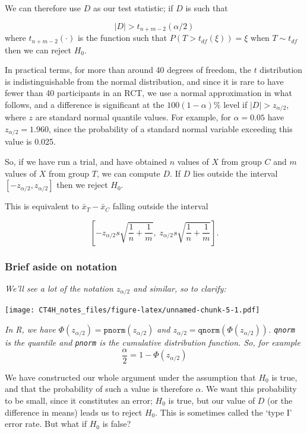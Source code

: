 \documentclass[
  openany]{book}
\theoremstyle{definition}
\theoremstyle{definition}
\theoremstyle{definition}
\theoremstyle{definition}
\theoremstyle{remark}
\begin{document}
We can therefore use \(D\) as our test statistic; if \(D\) is such that

\[ |D| > t_{n+m-2}\left(\alpha/2\right)\]
where
\(t_{n+m-2}\left(\cdot\right)\) is the function such that \(P\left(T>t_{df}\left(\xi\right)\right) = \xi\) when \(T \sim{t_{df}}\) then we can reject \(H_0\).

In practical terms, for more than around 40 degrees of freedom, the \(t\) distribution is indistinguishable from the normal distribution, and since it is rare to have fewer than 40 participants in an RCT, we use a normal approximation in what follows, and a difference is significant at the \(100\left(1-\alpha\right) \%\) level if \(|D| > z_{\alpha/2}\), where \(z\) are standard normal quantile values. For example, for \(\alpha=0.05\) have \(z_{\alpha/2} = 1.960\), since the probability of a standard normal variable exceeding this value is 0.025.

So, if we have run a trial, and have obtained \(n\) values of \(X\) from group \(C\) and \(m\) values of \(X\) from group \(T\), we can compute \(D\). If \(D\) lies outside the interval \(\left[-z_{\alpha/2}, z_{\alpha/2}\right]\) then we reject \(H_0\).

This is equivalent to \(\bar{x}_T - \bar{x}_C\) falling outside the interval

\[\left[-z_{\alpha/2}s\sqrt{\frac{1}{n} + \frac{1}{m}},\; z_{\alpha/2}s\sqrt{\frac{1}{n} + \frac{1}{m}}  \right]. \]

\hypertarget{brief-aside-on-notation}{%
\subsubsection*{Brief aside on notation}\label{brief-aside-on-notation}}

\emph{We'll see a lot of the notation \(z_{\alpha/2}\) and similar, so to clarify:}

\texttt{[image: CT4H\_notes\_files/figure-latex/unnamed-chunk-5-1.pdf]}

\emph{In R, we have \(\Phi\left(z_{\alpha/2}\right) = \texttt{pnorm}\left(z_{\alpha/2}\right)\) and \(z_{\alpha/2} = \texttt{qnorm}\left(\Phi\left(z_{\alpha/2}\right)\right)\). \texttt{qnorm} is the quantile and \texttt{pnorm} is the cumulative distribution function. So, for example}
\[\frac{\alpha}{2} = 1 - \Phi\left(z_{\alpha/2}\right)\]

We have constructed our whole argument under the assumption that \(H_0\) is true, and that the probability of such a value is therefore \(\alpha\). We want this probability to be small, since it constitutes an error; \(H_0\) is true, but our value of \(D\) (or the difference in means) leads us to reject \(H_0\). This is sometimes called the `type I' error rate. But what if \(H_0\) is false?
\end{document}
